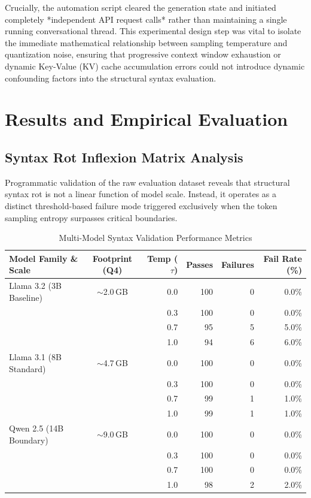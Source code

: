 \documentclass[11pt,journal,compsoc,onecolumn]{IEEEtran}
\begin{document}
Crucially, the automation script cleared the generation state and initiated completely *independent API request calls* rather than maintaining a single running conversational thread. This experimental design step was vital to isolate the immediate mathematical relationship between sampling temperature and quantization noise, ensuring that progressive context window exhaustion or dynamic Key-Value (KV) cache accumulation errors could not introduce dynamic confounding factors into the structural syntax evaluation.

\section{Results and Empirical Evaluation}
\label{sec:results}

\subsection{Syntax Rot Inflexion Matrix Analysis}
Programmatic validation of the raw evaluation dataset reveals that structural syntax rot is not a linear function of model scale. Instead, it operates as a distinct threshold-based failure mode triggered exclusively when the token sampling entropy surpasses critical boundaries.

\begin{table}[h]
\caption{Multi-Model Syntax Validation Performance Metrics}
\label{tab:metrics_table}
\centering
\small
\begin{tabular}{lcrrrr}
\toprule
\textbf{Model Family \& Scale} & \textbf{Footprint (Q4)} & \textbf{Temp ($\tau$)} & \textbf{Passes} & \textbf{Failures} & \textbf{Fail Rate (\%)} \\
\midrule
Llama 3.2 (3B Baseline) & $\sim$2.0\,GB & 0.0 & 100 & 0 & 0.0\% \\
                        &               & 0.3 & 100 & 0 & 0.0\% \\
                        &               & 0.7 & 95  & 5 & 5.0\% \\
                        &               & 1.0 & 94  & 6 & 6.0\% \\
\midrule
Llama 3.1 (8B Standard) & $\sim$4.7\,GB & 0.0 & 100 & 0 & 0.0\% \\
                        &               & 0.3 & 100 & 0 & 0.0\% \\
                        &               & 0.7 & 99  & 1 & 1.0\% \\
                        &               & 1.0 & 99  & 1 & 1.0\% \\
\midrule
Qwen 2.5 (14B Boundary) & $\sim$9.0\,GB & 0.0 & 100 & 0 & 0.0\% \\
                        &               & 0.3 & 100 & 0 & 0.0\% \\
                        &               & 0.7 & 100 & 0 & 0.0\% \\
                        &               & 1.0 & 98  & 2 & 2.0\% \\
\bottomrule
\end{tabular}
\end{table}
\end{document}
